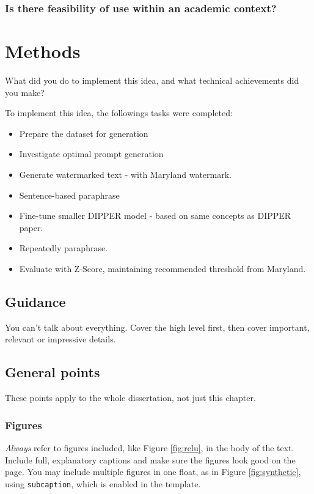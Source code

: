 \documentclass{l4proj}
\theoremstyle{definition}
\begin{document}
    \subsection{Is there feasibility of use within an academic context?}
    
    
\chapter{Methods}
What did you do to implement this idea, and what technical achievements did you make?

To implement this idea, the followings tasks were completed:
\begin{itemize}
    \setlength\itemsep{0.5em}
    \item Prepare the dataset for generation
    \item Investigate optimal prompt generation
    \item Generate watermarked text - with Maryland watermark.
    \item Sentence-based paraphrase
    \item Fine-tune smaller DIPPER model - based on same concepts as DIPPER paper.
    \item Repeatedly paraphrase.
    \item Evaluate with Z-Score, maintaining recommended threshold from Maryland. 
\end{itemize}

\section{Guidance}
You can't talk about everything. Cover the high level first, then cover important, relevant or impressive details.


\section{General points}

These points apply to the whole dissertation, not just this chapter.



\subsection{Figures}
\emph{Always} refer to figures included, like Figure \ref{fig:relu}, in the body of the text. Include full, explanatory captions and make sure the figures look good on the page.
You may include multiple figures in one float, as in Figure \ref{fig:synthetic}, using \texttt{subcaption}, which is enabled in the template.
\end{document}
